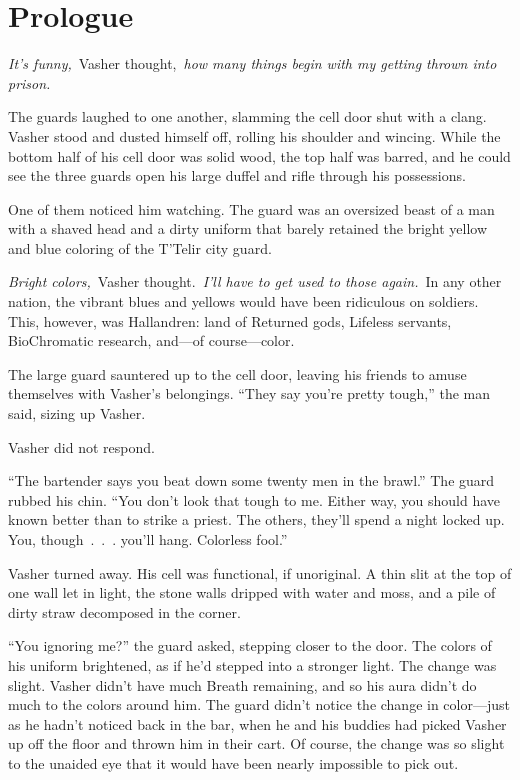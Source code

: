 \chapter*{Prologue}



\textit{It’s funny,}~Vasher thought,~\textit{how many things begin with my getting thrown into prison.}

The guards laughed to one another, slamming the cell door shut with a clang. Vasher stood and dusted himself off, rolling his shoulder and wincing. While the bottom half of his cell door was solid wood, the top half was barred, and he could see the three guards open his large duffel and rifle through his possessions.

One of them noticed him watching. The guard was an oversized beast of a man with a shaved head and a dirty uniform that barely retained the bright yellow and blue coloring of the T’Telir city guard.

\textit{Bright colors,}~Vasher thought.~\textit{I’ll have to get used to those again.}~In any other nation, the vibrant blues and yellows would have been ridiculous on soldiers. This, however, was Hallandren: land of Returned gods, Lifeless servants, BioChromatic research, and—of course—color.

The large guard sauntered up to the cell door, leaving his friends to amuse themselves with Vasher’s belongings. “They say you’re pretty tough,” the man said, sizing up Vasher.

Vasher did not respond.

“The bartender says you beat down some twenty men in the brawl.” The guard rubbed his chin. “You don’t look that tough to me. Either way, you should have known better than to strike a priest. The others, they’ll spend a night locked up. You, though~.~.~. you’ll hang. Colorless fool.”

Vasher turned away. His cell was functional, if unoriginal. A thin slit at the top of one wall let in light, the stone walls dripped with water and moss, and a pile of dirty straw decomposed in the corner.

“You ignoring me?” the guard asked, stepping closer to the door. The colors of his uniform brightened, as if he’d stepped into a stronger light. The change was slight. Vasher didn’t have much Breath remaining, and so his aura didn’t do much to the colors around him. The guard didn’t notice the change in color—just as he hadn’t noticed back in the bar, when he and his buddies had picked Vasher up off the floor and thrown him in their cart. Of course, the change was so slight to the unaided eye that it would have been nearly impossible to pick out.

